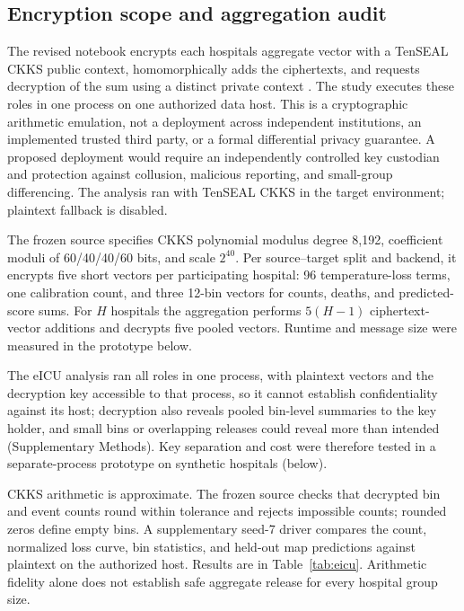 \documentclass[11pt]{article}
\begin{document}
\subsection*{Encryption scope and aggregation audit}\label{encryption-scope-and-aggregation-audit}

The revised notebook encrypts each hospital\textquotesingle s aggregate vector with a TenSEAL CKKS public context, homomorphically adds the ciphertexts, and requests decryption of the sum using a distinct private context \cite{r7,r18}. The study executes these roles in one process on one authorized data host. This is a cryptographic arithmetic emulation, not a deployment across independent institutions, an implemented trusted third party, or a formal differential privacy guarantee. A proposed deployment would require an independently controlled key custodian and protection against collusion, malicious reporting, and small-group differencing. The analysis ran with TenSEAL CKKS in the target environment; plaintext fallback is disabled.

The frozen source specifies CKKS polynomial modulus degree 8,192, coefficient moduli of 60/40/40/60 bits, and scale $2^{40}$. Per source--target split and backend, it encrypts five short vectors per participating hospital: 96 temperature-loss terms, one calibration count, and three 12-bin vectors for counts, deaths, and predicted-score sums. For $H$ hospitals the aggregation performs $5(H-1)$ ciphertext-vector additions and decrypts five pooled vectors. Runtime and message size were measured in the prototype below.

The eICU analysis ran all roles in one process, with plaintext vectors and the decryption key accessible to that process, so it cannot establish confidentiality against its host; decryption also reveals pooled bin-level summaries to the key holder, and small bins or overlapping releases could reveal more than intended (Supplementary Methods). Key separation and cost were therefore tested in a separate-process prototype on synthetic hospitals (below).

CKKS arithmetic is approximate. The frozen source checks that decrypted bin and event counts round within tolerance and rejects impossible counts; rounded zeros define empty bins. A supplementary seed-7 driver compares the count, normalized loss curve, bin statistics, and held-out map predictions against plaintext on the authorized host. Results are in Table~\ref{tab:eicu}. Arithmetic fidelity alone does not establish safe aggregate release for every hospital group size.
\end{document}
